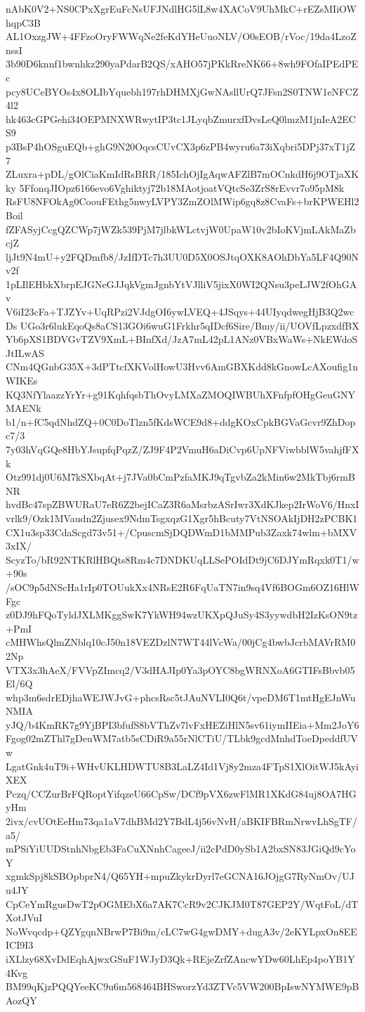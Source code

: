 nAbK0V2+NS0CPxXgrEuFcNsUFJNdlHG5lL8w4XACoV9UhMkC+rEZsMIiOWhqpC3B
AL1OxzgJW+4FFzoOryFWWqNe2feKdYHeUuoNLV/O0sEOB/rVoc/19da4LzoZnssI
3b90D6knnf1bwnhkz290yaPdarB2QS/xAHO57jPKkRreNK66+8wh9FOfaIPEdPEc
pcy8UCeBYOs4x8OLIbYquebh197rhDHMXjGwNAsllUrQ7JFsn2S0TNW1eNFCZ4l2
hk463cGPGehi34OEPMNXWRwytIP3tc1JLyqbZmurxfDvsLeQ0lmzM1jnIeA2ECS9
p3BsP4hOSguEQb+ghG9N20OqcsCUvCX3p6zPB4wyru6a73iXqbri5DPj37xT1jZ7
ZLuxra+pDL/gOlCiaKmIdRsBRR/185IchOjIgAqwAFZlB7mOCnkdH6j9OTjaXKky
5FfonqJIOpz6166evo6Vghiktyj72b18MAotjoatVQtcSe3ZrS8rEvvr7o95pM8k
RsFU8NFOkAg0CoouFEthg5nwyLVPY3ZmZOlMWip6gq8z8CvaFs+brKPWEHl2Boil
fZFASyjCcgQZCWp7jWZk539PjM7jlbkWLctvjW0UpaW10v2bIoKVjmLAkMaZbcjZ
ljJt9N4mU+y2FQDmfb8/JzIfDTc7h3UU0D5X0OSJtqOXK8AOhDbYa5LF4Q90Nv2f
1pLIlEHbkXbrpEJGNeGJJqkVgmJgnbYtVJlliV5jixX0WI2QNsu3peLJW2fOhGAv
V6iI23cFa+TJZYv+UqRPzi2VJdgOI6ywLVEQ+4JSqys+44UIyqdwegHjB3Q2wcDs
UGo3r6lukEqoQs8aCS13GOi6wuG1Frkhr5qIDcf6Sire/Bmy/ii/UOVfLpzxdfBX
Yb6pXS1BDVGvTZV9XmL+BInfXd/JzA7mL42pL1ANz0VBxWaWs+NkEWdoSJtILwAS
CNm4QGnbG35X+3dPTtcfXKVolHowU3Hvv6AmGBXKdd8kGnowLcAXoufig1nWIKEs
KQ3NfYlaazzYrYr+g91KqhfqsbThOvyLMXaZMOQIWBUhXFnfpfOHgGeuGNYMAENk
b1/n+fC5qdNhdZQ+0C0DoTlzn5fKdsWCE9d8+ddgKOxCpkBGVaGcvr9ZhDopc7/3
7y03hVqGQe8HbYJsupfqPqzZ/ZJ9F4P2VmuH6aDiCvp6UpNFViwbblW5vahjfFXk
Otz991dj0U6M7kSXbqAt+j7JVa0bCmPzfaMKJ9qTgvbZa2kMin6w2MkTbj6rmBNR
hvdBc47spZBWURaU7eR6Z2bejICaZ3R6aMsrbzASrIwr3XdKJkep2IrWoV6/HnxI
vrlk9/Ozk1MVaudn2Zjusex9NdmTsgxqzG1Xgr5hBcuty7VtNSOAkIjDH2zPCBK1
CX1u3sp33CdaScgd73v51+/CpuscmSjDQDWmD1bMMPub3Zaxk74wlm+bMXV3xIX/
ScyzTo/bR92NTKRlHBQts8Rm4c7DNDKUqLLSePOIdDt9jC6DJYmRqxk0T1/w+90s
/sOC9p5dNScHa1rIp0TOUukXx4NRsE2R6FqUaTN7in9sq4Vf6BOGm6OZ16HlWFgc
z0DJ9hFQoTyldJXLMKggSwK7YkWH94wzUKXpQJuSy4S3yywdbH2IzKsON9tz+PmI
cMHWhsQlmZNblq10cJ50n18VEZDzlN7WT44lVcWa/00jCg4bwbJcrbMAVrRM02Np
VTX3x3hAeX/FVVpZImcq2/V3dHAJIp0Ya3pOYC8bgWRNXoA6GTIFsBbvb05El/6Q
whp3m6sdrEDjhaWEJWJvG+phcsRsc5tJAuNVLI0Q6t/vpeDM6T1mtHgEJnWuNMIA
yJQ/b4KmRK7g9YjBPI3bfufS8bVThZv7lvFxHEZiHlN5sv61iymIIEia+Mm2JoY6
Fgog02mZThl7gDeuWM7atb5sCDiR9a55rNlCTiU/TLbk9gcdMnhdToeDpeddfUVw
LgatGnk4uT9i+WHvUKLHDWTU8B3LaLZ4Id1Vj8y2mza4FTpS1XlOitWJ5kAyiXEX
Pczq/CCZurBrFQRoptYifqzeU66CpSw/DCf9pVX6zwFlMR1XKdG84uj8OA7HGyHm
2ivx/cvUOtEeHm73qa1aV7dhBMd2Y7BdL4j56vNvH/aBKIFBRmNrwvLhSgTF/a5/
mPSiYiUUDStnhNbgEb3FaCuXNnhCageeJ/ii2cPdD0ySb1A2bxSN83JGiQd9cYoY
xgmkSpj8kSBOpbprN4/Q65YH+mpuZkykrDyrl7eGCNA16JOjgG7RyNmOv/UJu4JY
CpCeYmRgusDwT2pOGMEbX6a7AK7CcR9v2CJKJM0T87GEP2Y/WqtFoL/dTXotJVuI
NoWvqcdp+QZYgqnNBrwP7Bi9m/cLC7wG4gwDMY+dugA3v/2eKYLpxOn8EEICI9I3
iXLlzy68XvDdEqhAjwxGSuF1WJyD3Qk+REjeZrfZAncwYDw60LhEp4poYB1Y4Kvg
BM99qKjzPQQYeeKC9u6m568464BHSworzYd3ZTVc5VW200BpIswNYMWE9pBAozQY
